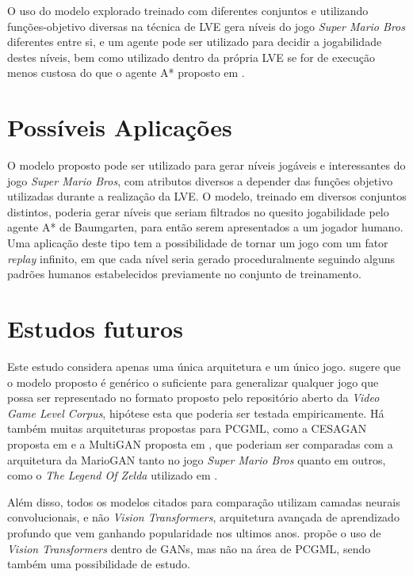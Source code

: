 O uso do modelo explorado treinado com diferentes conjuntos e utilizando funções-objetivo diversas na técnica de LVE gera níveis do jogo \textit{Super Mario Bros} diferentes entre si, e um agente pode ser utilizado para decidir a jogabilidade destes níveis, bem como utilizado dentro da própria LVE se for de execução menos custosa do que o agente A* proposto em \cite{marioAI}.

\section{Possíveis Aplicações}

O modelo proposto pode ser utilizado para gerar níveis jogáveis e interessantes do jogo \textit{Super Mario Bros}, com atributos diversos a depender das funções objetivo utilizadas durante a realização da LVE. O modelo, treinado em diversos conjuntos distintos, poderia gerar níveis que seriam filtrados no quesito jogabilidade pelo agente A* de Baumgarten, para então serem apresentados a um jogador humano. Uma aplicação deste tipo tem a possibilidade de tornar um jogo com um fator \textit{replay} infinito, em que cada nível seria gerado proceduralmente seguindo alguns padrões humanos estabelecidos previamente no conjunto de treinamento. 

\section{Estudos futuros}

Este estudo considera apenas uma única arquitetura e um único jogo. \citet{marioGAN} sugere que o modelo proposto é genérico o suficiente para generalizar qualquer jogo que possa ser representado no formato proposto pelo repositório aberto da \textit{Video Game Level Corpus}, hipótese esta que poderia ser testada empiricamente. Há também muitas arquiteturas propostas para PCGML, como a CESAGAN proposta em \citet{cesagan} e a MultiGAN proposta em \citet{multigan}, que poderiam ser comparadas com a arquitetura da MarioGAN tanto no jogo \textit{Super Mario Bros} quanto em outros, como o \textit{The Legend Of Zelda} utilizado em \cite{cesagan}.

Além disso, todos os modelos citados para comparação utilizam camadas neurais convolucionais, e não \textit{Vision Transformers}, arquitetura avançada de aprendizado profundo que vem ganhando popularidade nos ultimos anos. \citet{vitgan} propõe o uso de \textit{Vision Transformers} dentro de GANs, mas não na área de PCGML, sendo também uma possibilidade de estudo.

